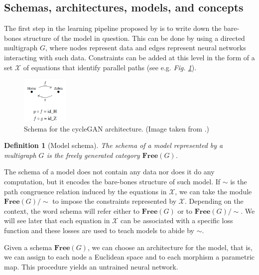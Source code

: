 \documentclass[11pt,a4paper,openright,twoside]{report}
\newcounter{mycounter}
\theoremstyle{plain}
\newtheorem{definition}[mycounter]{Definition}
\theoremstyle{definition}
\begin{document}
\subsection{Schemas, architectures, models, and concepts}

The first step in the learning pipeline proposed by \cite{gavranovic2019compositional} is to write down the bare-bones structure of the model in question. This can be done by using a directed multigraph $G$, where nodes represent data and edges represent neural networks interacting with such data. Constraints can be added at this level in the form of a set $\mathcal{X}$ of equations that identify parallel paths (see e.g. \textit{Fig. \ref{fig: cyclegan}}). 

\begin{figure}[h]
  \begin{center}
    \includegraphics[width=0.2\textwidth]{figures/cyclegan_schema.png}     
    \caption[CycleGAN schema]{Schema for the cycleGAN architecture. (Image taken from \cite{gavranovic2019compositional}.)}
    \label{fig: cyclegan}
  \end{center}
\end{figure}


\begin{definition}[Model schema]
  The schema of a model represented by a multigraph $G$ is the freely generated category $\mathbf{Free}(G)$.
\end{definition}

The schema of a model does not contain any data nor does it do any computation, but it encodes the bare-bones structure of such model. If ${\sim}$ is the path congruence relation induced by the equations in $\mathcal{X}$, we can take the module $\mathbf{Free}(G)/{\sim}$ to impose the constraints represented by $\mathcal{X}$. Depending on the context, the word schema will refer either to $\mathbf{Free}(G)$ or to $\mathbf{Free}(G)/{\sim}$. We will see later that each equation in $\mathcal{X}$ can be associated with a specific loss function and these losses are used to teach models to abide by ${\sim}$.

Given a schema $\mathbf{Free}(G)$, we can choose an architecture for the model, that is, we can assign to each node a Euclidean space and to each morphism a parametric map. This procedure yields an untrained neural network.
\end{document}
